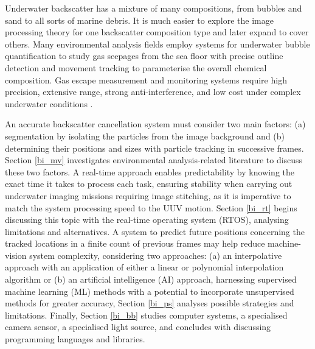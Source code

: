 Underwater backscatter has a mixture of many compositions, from bubbles and sand to all sorts of marine debris. It is much easier to explore the image processing theory for one backscatter composition type and later expand to cover others. Many environmental analysis fields employ systems for underwater bubble quantification to study gas seepages from the sea floor with precise outline detection and movement tracking to parameterise the overall chemical composition. Gas escape measurement and monitoring systems require high precision, extensive range, strong anti-interference, and low cost under complex underwater conditions \cite{zhangUnderwaterBubbleEscape2023}.

An accurate backscatter cancellation system must consider two main factors: (a) segmentation by isolating the particles from the image background and (b) determining their positions and sizes with particle tracking in successive frames. Section \ref{bi_mv} investigates environmental analysis-related literature to discuss these two factors. A real-time approach enables predictability by knowing the exact time it takes to process each task, ensuring stability when carrying out underwater imaging missions requiring image stitching, as it is imperative to match the system processing speed to the UUV motion. Section \ref{bi_rt} begins discussing this topic with the real-time operating system (RTOS), analysing limitations and alternatives. A system to predict future positions concerning the tracked locations in a finite count of previous frames may help reduce machine-vision system complexity, considering two approaches: (a) an interpolative approach with an application of either a linear or polynomial interpolation algorithm or (b) an artificial intelligence (AI) approach, harnessing supervised machine learning (ML) methods with a potential to incorporate unsupervised methods for greater accuracy, Section \ref{bi_ps} analyses possible strategies and limitations. Finally, Section \ref{bi_bb} studies computer systems, a specialised camera sensor, a specialised light source, and concludes with discussing programming languages and libraries.

